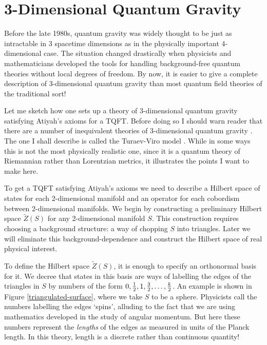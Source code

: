 \documentclass[12pt,amsfonts]{article}
\begin{document}
\section{3-Dimensional Quantum Gravity} \label{3dQG}

Before the late 1980s, quantum gravity was widely thought to be just as
intractable in 3 spacetime dimensions as in the physically important
4-dimensional case.  The situation changed drastically when physicists
and mathematicians developed the tools for handling background-free
quantum theories without local degrees of freedom.  By now, it is easier
to give a complete description of 3-dimensional quantum gravity than
most quantum field theories of the traditional sort!   

Let me sketch how one sets up a theory of 3-dimensional quantum gravity
satisfying Atiyah's axioms for a TQFT.    Before doing so I should warn
reader that there are a number of inequivalent theories of 3-dimensional
quantum gravity \cite{Carlip}.  The one I shall describe is called the
Turaev-Viro model \cite{Turaev}.   While in some ways this is not the
most physically realistic one, since it is a quantum theory of Riemannian
rather than Lorentzian metrics, it illustrates the points I want to make
here.  

To get a TQFT satisfying Atiyah's axioms we need to describe a Hilbert
space of states for each 2-dimensional manifold and an operator for each
cobordism between 2-dimensional manifolds.  We begin by constructing a
preliminary Hilbert space $\tilde{Z}(S)$ for any 2-dimensional manifold 
$S$.  This construction requires choosing a background structure: a way
of chopping $S$ into triangles.   Later we will eliminate this
background-dependence and construct the Hilbert space of real physical
interest.   

To define the Hilbert space $\tilde{Z}(S)$, it is enough to specify an
orthonormal basis for it.  We decree that states in this basis are ways
of labelling the edges of the triangles in $S$ by numbers of the form
$0,{1\over 2},1,{3\over 2},\dots,{k\over 2}$.  An example is shown in 
Figure \ref{triangulated-surface}, where we take $S$ to be a sphere.   
Physicists call the numbers labelling the edges `spins',
alluding to the fact that we are using mathematics developed in the
study of angular momentum.  But here these numbers represent the {\it
lengths} of the edges as measured in units of the Planck length.  In
this theory, length is a discrete rather than continuous quantity!   
\end{document}
